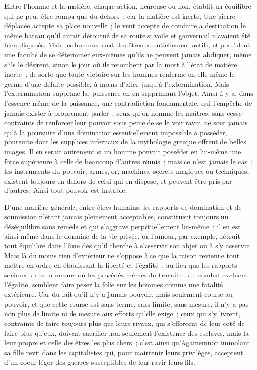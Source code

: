 \documentclass[french,twoside]{book} %
\begin{document}
Entre l'homme et la matière, chaque action, heureuse ou non, établit un équilibre qui ne peut être rompu que du dehors ; car la matière est inerte, Une pierre déplacée accepte sa place nouvelle ; le vent accepte de conduire a destination le même bateau qu'il aurait détourné de sa route si voile et gouvernail n'avaient été bien disposés. Mais les hommes sont des êtres essentiellement actifs, et possèdent une faculté de se déterminer eux-mêmes qu'ils ne peuvent jamais abdiquer, même s'ils le désirent, sinon le jour où ils retombent par la mort à l'état de matière inerte ; de sorte que toute victoire sur les hommes renferme en elle-même le germe d'une défaite possible, à moins d'aller jusqu'à l'extermination. Mais l'extermination supprime la, puissance en en supprimant l'objet. Ainsi il y a, dans l'essence même de la puissance, une contradiction fondamentale, qui l'empêche de jamais exister à proprement parler ; ceux qu'on nomme les maîtres, sans cesse contraints de renforcer leur pouvoir sous peine de se le voir ravir, ne sont jamais qu'à la poursuite d'une domination essentiellement impossible à posséder, poursuite dont les supplices infernaux de la mythologie grecque offrent de belles images. Il en serait autrement si un homme pouvait posséder en lui-même une force supérieure à celle de beaucoup d'autres réunis ; mais ce n'est jamais le cas ; les instruments du pouvoir, armes, or, machines, secrets magiques ou techniques, existent toujours en dehors de celui qui en dispose, et peuvent être pris par d'autres. Ainsi tout pouvoir est instable.\par
D'une manière générale, entre êtres humains, les rapports de domination et de soumission n'étant jamais pleinement acceptables, constituent toujours un déséquilibre sans remède et qui s'aggrave perpétuellement lui-même ; il en est ainsi même dans le domaine de la vie privée, où l'amour, par exemple, détruit tout équilibre dans l'âme dès qu'il cherche à s'asservir son objet ou à s'y asservir. Mais là du moins rien d'extérieur ne s'oppose à ce que la raison revienne tout mettre en ordre en établissant la liberté et l'égalité ; au lieu que les rapports sociaux, dans la mesure où les procédés mêmes du travail et du combat excluent l'égalité, semblent faire peser la folie sur les hommes comme une fatalité extérieure. Car du fait qu'il n'y a jamais pouvoir, mais seulement course au pouvoir, et que cette course est sans terme, sans limite, sans mesure, il n'y a pas non plus de limite ni de mesure aux efforts qu'elle exige ; ceux qui s'y livrent, contraints de faire toujours plus que leurs rivaux, qui s'efforcent de leur coté de faire plus qu'eux, doivent sacrifier non seulement l'existence des esclaves, mais la leur propre et celle des êtres les plus chers ; c'est ainsi qu'Agamemnon immolant sa fille revit dans les capitalistes qui, pour maintenir leurs privilèges, acceptent d'un coeur léger des guerres susceptibles de leur ravir leurs fils.\par
\end{document}
